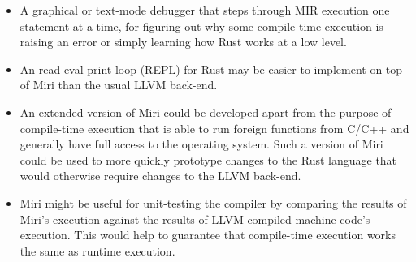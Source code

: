 \documentclass[twocolumn]{article}
\begin{document}
\begin{itemize}
  \item A graphical or text-mode debugger that steps through MIR execution one statement at a time,
    for figuring out why some compile-time execution is raising an error or simply learning how Rust
    works at a low level.
  \item An read-eval-print-loop (REPL) for Rust may be easier to implement on top of Miri than the
    usual LLVM back-end.
  \item An extended version of Miri could be developed apart from the purpose of compile-time
    execution that is able to run foreign functions from C/C++ and generally have full access to the
    operating system. Such a version of Miri could be used to more quickly prototype changes to the
    Rust language that would otherwise require changes to the LLVM back-end.
  \item Miri might be useful for unit-testing the compiler by comparing the results of Miri's
    execution against the results of LLVM-compiled machine code's execution. This would help to
    guarantee that compile-time execution works the same as runtime execution.
\end{itemize}
\end{document}
